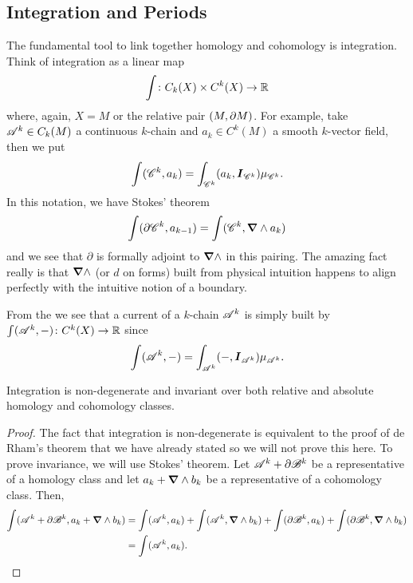 \documentclass{article}
\begin{document}
\subsection{Integration and Periods}
The fundamental tool to link together homology and cohomology is integration. Think of integration as a linear map
\begin{equation}
    \int \colon C_k(X) \times C^k(X) \to \mathbb{R}
\end{equation}
where, again, $X=M$ or the relative pair $(M,{\partial M})$. For example, take $\mathscr{A}^k \in C_k(M)$ a continuous $k$-chain and $a_k\in C^k(M)$ a smooth $k$-vector field, then we put
\begin{equation}
    \int (\mathscr{C}^k,a_k) = \int_{\mathscr{C}^k} (a_k,\boldsymbol{I}_{\mathscr{C}^k}) \mu_{\mathscr{C}^k}.
\end{equation}
In this notation, we have Stokes' theorem
\begin{equation}
    \int (\partial \mathscr{C}^k,a_{k-1}) = \int (\mathscr{C}^k, \boldsymbol{\nabla} \wedge a_k)
\end{equation}
and we see that $\partial$ is formally adjoint to $\boldsymbol{\nabla} \wedge$ in this pairing. The amazing fact really is that $\boldsymbol{\nabla} \wedge$ (or $d$ on forms) built from physical intuition happens to align perfectly with the intuitive notion of a boundary. 

From the we see that a current of a $k$-chain $\mathscr{A}^k$ is simply built by $\int(\mathscr{A}^k,-)\colon C^k(X) \to \mathbb{R}$ since
\begin{equation}
    \int (\mathscr{A}^k,-) = \int_{\mathscr{A}^k} (-, \boldsymbol{I}_{\mathscr{A}^k}) \mu_{\mathscr{A}^k}.
\end{equation}

\begin{theorem}
Integration is non-degenerate and invariant over both relative and absolute homology and cohomology classes.
\end{theorem}
\begin{proof}
The fact that integration is non-degenerate is equivalent to the proof of de Rham's theorem that we have already stated so we will not prove this here. To prove invariance, we will use Stokes' theorem. Let $\mathscr{A}^k + \partial \mathscr{B}^k$ be a representative of a homology class and let $a_k + \boldsymbol{\nabla} \wedge b_k$ be a representative of a cohomology class. Then,
\begin{align}
    \int (\mathscr{A}^k + \partial \mathscr{B}^k, a_k + \boldsymbol{\nabla} \wedge b_k) &= \int (\mathscr{A}^k,a_k) + \int (\mathscr{A}^k,\boldsymbol{\nabla} \wedge b_k) +\int(\partial \mathscr{B}^k, a_k) + \int(\partial \mathscr{B}^k, \boldsymbol{\nabla} \wedge b_k)\\
    &= \int(\mathscr{A}^k,a_k).
\end{align}
\end{proof}
\end{document}
